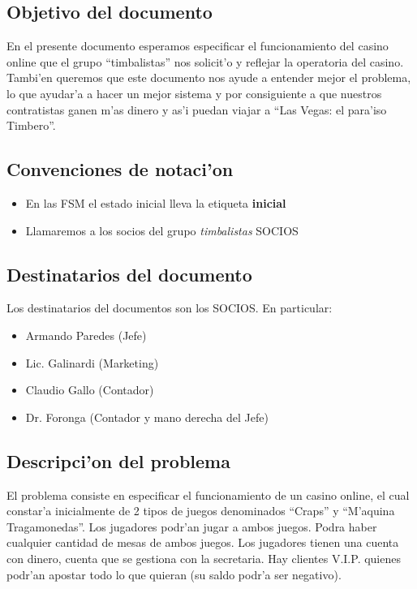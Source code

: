 \subsection{ Objetivo del documento	}
En el presente documento esperamos especificar el funcionamiento del casino online 
que el grupo ``timbalistas'' nos solicit'o y reflejar la operatoria
del casino. Tambi'en queremos que este documento nos ayude a entender mejor el problema, 
lo que ayudar'a a hacer un mejor sistema y por consiguiente a que nuestros contratistas ganen m'as dinero
y as'i puedan viajar a ``Las Vegas: el para'iso Timbero''.


\subsection{ Convenciones de notaci'on	}
\begin{itemize}
 \item En las FSM el estado inicial lleva la etiqueta \textbf{inicial}
 \item Llamaremos a los socios del grupo \textit{timbalistas} SOCIOS
\end{itemize}


\subsection{ Destinatarios del documento	}
Los destinatarios del documentos son los SOCIOS. En particular:

\begin{itemize}
    \item Armando Paredes (Jefe)
    \item Lic. Galinardi (Marketing)
    \item Claudio Gallo (Contador)
    \item Dr. Foronga (Contador y mano derecha del Jefe)
\end{itemize}


\subsection{ Descripci'on del problema }

El problema consiste en especificar el funcionamiento de un casino online, el cual constar'a inicialmente de 2 tipos
de juegos denominados ``Craps'' y ``M'aquina Tragamonedas''. Los jugadores podr'an jugar a ambos juegos. Podra haber
cualquier cantidad de mesas de ambos juegos. Los jugadores tienen una cuenta con dinero, cuenta que se gestiona con la secretaria.
Hay clientes V.I.P. quienes podr'an apostar todo lo que quieran (su saldo podr'a ser negativo).




